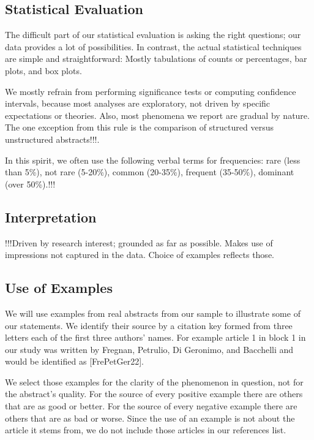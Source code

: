 \documentclass[10pt,journal,compsoc]{IEEEtran}
\newcommand{\Art}[1]{\bgroup[#1]\egroup} %
\begin{document}
\subsection{Statistical Evaluation}

The difficult part of our statistical evaluation is asking the right questions;
our data provides a lot of possibilities.
In contrast, the actual statistical techniques are simple and straightforward:
Mostly tabulations of counts or percentages, bar plots, and box plots.

We mostly refrain from performing significance tests or computing confidence intervals,
because most analyses are exploratory, not driven by specific expectations or theories.
Also, most phenomena we report are gradual by nature.
The one exception from this rule is the comparison of
structured versus unstructured abstracts!!!.

In this spirit, we often use the following verbal terms for frequencies:
rare (less than 5\%),
not rare (5-20\%),
common (20-35\%),
frequent (35-50\%),
dominant (over 50\%).!!!


\subsection{Interpretation}

!!!Driven by research interest; grounded as far as possible.
Makes use of impressions not captured in the data.
Choice of examples reflects those.


\subsection{Use of Examples}

We will use examples from real abstracts from our sample to illustrate
some of our statements.
We identify their source by a citation key
formed from three letters each of the first three authors' names.
For example article 1 in block 1 in our study was written by
Fregnan, Petrulio, Di Geronimo, and Bacchelli
and would be identified as \Art{FrePetGer22}.

We select those examples for the clarity of the phenomenon in question,
not for the abstract's quality.
For the source of every positive example there are others that are
as good or better.
For the source of every negative example there are others that are
as bad or worse.
Since the use of an example is not about the article it stems from,
we do not include those articles in our references list.
\end{document}
